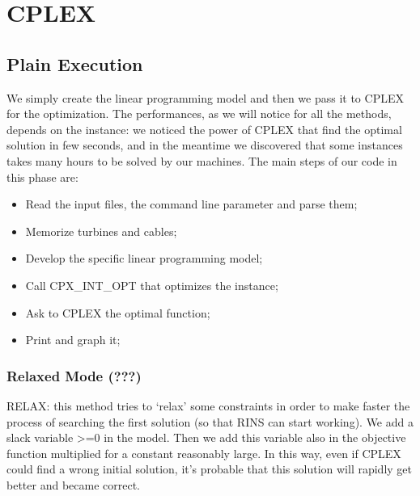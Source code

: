 
\chapter{CPLEX}

\label{chp:3-CPLEX}

\section{Plain Execution}
We simply create the linear programming model and then we pass it to CPLEX for the optimization. The performances, as we will notice for all the methods, depends on the instance: we noticed the power of CPLEX that find the optimal solution in few seconds, and in the meantime we discovered that some instances takes many hours to be solved by our machines. 
The main steps of our code in this phase are: 
\begin{itemize}
\item Read the input files, the command line parameter and parse them;
\item Memorize turbines and cables;
\item Develop the specific linear programming model;
\item Call CPX\_INT\_OPT that optimizes the instance;
\item Ask to CPLEX the optimal function;
\item Print and graph it;
\end{itemize}

\subsection{Relaxed Mode (???)}
RELAX: this method tries to ‘relax’ some constraints in order to make faster the process of searching the first solution (so that RINS can start working). We add a slack variable >=0 in the model. Then we add this variable also in the objective function multiplied for a constant reasonably large. In this way, even if CPLEX could find a wrong initial solution, it’s probable that this solution will rapidly get better and became correct. 

